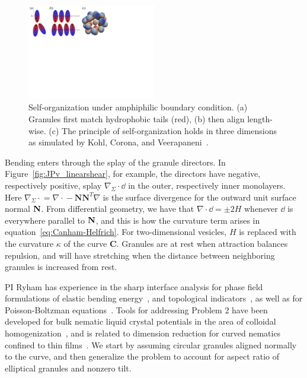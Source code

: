 \begin{figure}
  \vspace{-8pt}
  \centerline{\includegraphics[width=0.5\textwidth]{figures/SA1Figures/AmphiphilicAssembly.pdf}}
  \vspace{-8pt}
  \caption{\label{fig:amphiphilic_assembly} \footnotesize
  Self-organization under amphiphilic boundary condition. (a) Granules
  first match hydrophobic tails (red), (b) then align length-wise. (c)
  The principle of self-organization holds in three dimensions as
  simulated by Kohl, Corona, and
  Veerapaneni~\cite{koh-cor-che-vee2021}.}
\end{figure}
Bending enters through the splay of the granule directors. In
Figure~\ref{fig:JPv_linearshear}, for example, the directors have
negative, respectively positive, splay $\nabla_{\Sigma} \cdot \dd$ in
the outer, respectively inner monolayers. Here $\nabla_{\Sigma}\cdot{} =
\nabla \cdot {} - \mathbf{N}\mathbf{N}^T \nabla$ is the surface
divergence for the outward unit surface normal $\mathbf{N}$. From differential
geometry, we have that $\nabla\cdot \dd = \pm 2H$ whenever $\dd$ is
everywhere parallel to $\mathbf{N}$, and this is how the curvature term arises
in equation~\eqref{eq:Canham-Helfrich}. For two-dimensional vesicles,
$H$ is replaced with the curvature $\kappa$ of the curve $\mathbf{C}$.
Granules are at rest when attraction balances repulsion, and will have
stretching when the distance between neighboring granules is increased
from rest.

PI Ryham has experience in the sharp interface analysis for phase field
formulations of elastic bending energy~\cite{0951-7715-18-3-016, Du05},
and topological indicators~\cite{DuEuler}, as well as for
Poisson-Boltzman equations~\cite{Lee2018, 1531-3492_2006_2_357}. Tools
for addressing Problem 2 have been developed for bulk nematic liquid
crystal potentials in the area of colloidal
homogenization~\cite{Canevari2019DesignOE, doi:10.1137/18M1163919,
doi:10.1137/18M1163919, BERLYAND200597, doi:10.1137/130910348}, and is
related to dimension reduction for curved nematics confined to thin
films~\cite{Golovaty2017DimensionRF, Golovaty2015DimensionRF,
doi:10.1142/S0218202516500470, FoFrLe07}. We start by assuming circular
granules aligned normally to the curve, and then generalize the problem
to account for aspect ratio of elliptical granules and nonzero tilt. 

